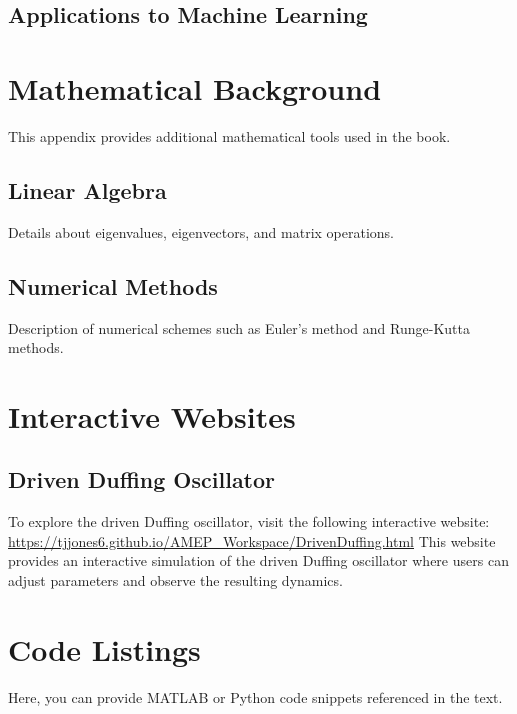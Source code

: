 \documentclass{amsbook}
\begin{document}
\section{Applications to Machine Learning}

\appendix
\chapter{Mathematical Background}
This appendix provides additional mathematical tools used in the book.

\section{Linear Algebra}
Details about eigenvalues, eigenvectors, and matrix operations.

\section{Numerical Methods}
Description of numerical schemes such as Euler's method and Runge-Kutta methods.

\chapter{Interactive Websites}
\section{Driven Duffing Oscillator}
To explore the driven Duffing oscillator, visit the following interactive website:
\url{https://tjjones6.github.io/AMEP_Workspace/DrivenDuffing.html}
\noindent This website provides an interactive simulation of the driven Duffing oscillator where users can adjust parameters and observe the resulting dynamics.

\chapter{Code Listings}
Here, you can provide MATLAB or Python code snippets referenced in the text.
\end{document}
